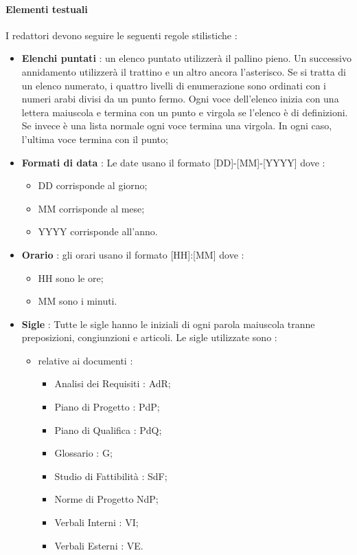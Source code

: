 \paragraph{Elementi testuali}
I redattori devono seguire le seguenti regole stilistiche :
\begin{itemize}
\item \textbf{Elenchi puntati} : un elenco puntato utilizzerà il pallino pieno. Un successivo annidamento utilizzerà il trattino e un altro ancora l'asterisco. Se si tratta di un elenco numerato, i quattro livelli di enumerazione sono ordinati con i numeri arabi divisi da un punto fermo. 
Ogni voce dell’elenco inizia con una lettera maiuscola e termina con un punto e virgola se l'elenco è di definizioni. Se invece è una lista normale ogni voce termina una virgola. In ogni caso, l'ultima voce termina con il punto;
\item \textbf{Formati di data} : Le date usano il formato [DD]-[MM]-[YYYY] dove :
\begin{itemize}
\item DD corrisponde al giorno;
\item MM corrisponde al mese;
\item YYYY corrisponde all’anno.
\end{itemize}
\item \textbf{Orario} : gli orari usano il formato [HH]:[MM] dove :
\begin{itemize}
\item HH sono le ore;
\item MM sono i minuti.
\end{itemize}
\item \textbf{Sigle} : Tutte le sigle hanno le iniziali di ogni parola maiuscola tranne preposizioni, congiunzioni e articoli. Le sigle utilizzate sono :
\begin{itemize}
\item relative ai documenti :
\begin{itemize}
\item Analisi dei Requisiti : AdR;
\item Piano di Progetto : PdP;
\item Piano di Qualifica : PdQ;
\item Glossario : G;
\item Studio di Fattibilità : SdF;
\item Norme di Progetto NdP;
\item Verbali Interni : VI;
\item Verbali Esterni : VE.
\end{itemize}


\end{itemize}
\end{itemize}
